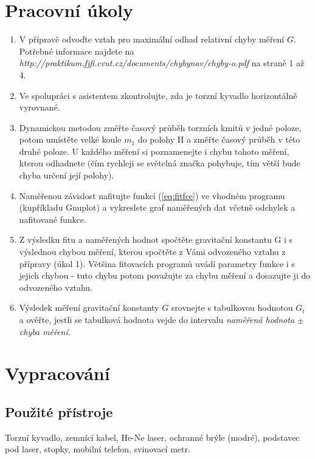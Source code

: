 \documentclass[english]{article}
\begin{document}


\setlength{\parindent}{0.5cm}

\section{Pracovní úkoly}

	\begin{enumerate}
		\item V přípravě odvoďte vztah pro maximální odhad relativní chyby měření $G$. Potřebné informace najdete na \emph{http://praktikum.fjfi.cvut.cz/documents/chybynav/chyby-o.pdf} na straně 1 až 4.
		\item Ve spolupráci s asistentem zkontrolujte, zda je torzní kyvadlo horizontálně vyrovnané.
		\item Dynamickou metodou změřte časový průběh torzních kmitů v jedné poloze, potom umístěte velké koule $m_{1}$ do polohy II a změřte časový průběh v této druhé poloze. U každého měření si poznamenejte i chybu tohoto měření, kterou odhadnete (čím rychleji se světelná značka pohybuje, tím větší bude chyba určení její polohy).
		\item Naměřenou závislost nafitujte funkcí (\ref{eq:fitfce}) ve vhodném programu (kupříkladu Gnuplot) a vykreslete graf naměřených dat včetně odchylek a nafitované funkce.
		\item Z výsledku fitu a naměřených hodnot spočtěte gravitační konstantu G i s výslednou chybou měření, kterou spočtěte z Vámi odvozeného vztahu z přípravy (úkol 1). Většina fitovacích programů uvádí parametry funkce i s jejich chybou - tuto chybu potom považujte za chybu měření a dosazujte ji do odvozeného vztahu.
		\item Výsledek měření gravitační konstanty $G$ srovnejte s tabulkovou hodnotou $G_t$ a ověřte, jestli se tabulková hodnota vejde do intervalu \emph{naměřená hodnota} $\pm$ \emph{chyba měření}.
	\end{enumerate}
	
\section{Vypracování}

	\subsection{Použité přístroje}
		Torzní kyvadlo, zemnící kabel, He-Ne laser, ochranné brýle (modré), podstavec pod laser, stopky, mobilní telefon, svinovací metr.
	
\end{document}
